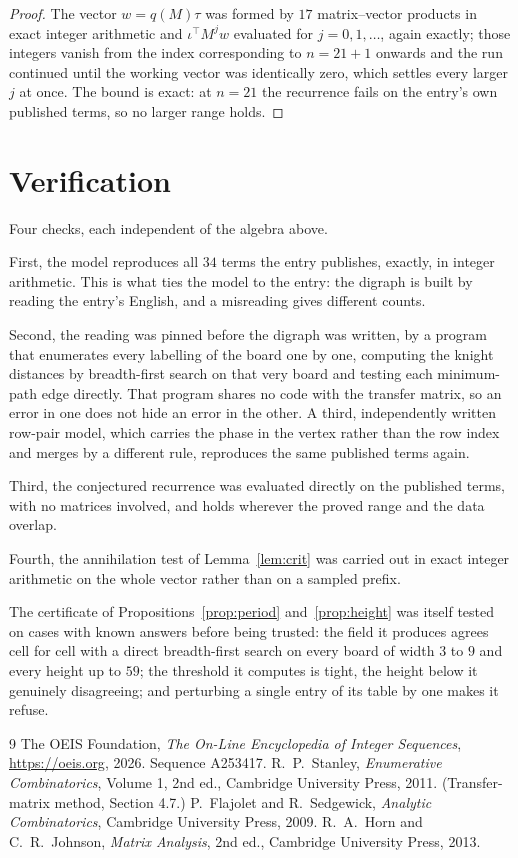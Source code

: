 \documentclass[11pt,a4paper]{article}
\theoremstyle{plain}
\theoremstyle{definition}
\begin{document}
\begin{proof}
The vector $w=q(M)\tau$ was formed by $17$ matrix--vector products in exact integer
arithmetic and $\iota^{\!\top}M^{j}w$ evaluated for $j=0,1,\dots$, again exactly; those
integers vanish from the index corresponding to $n=21+1$ onwards and the run continued
until the working vector was identically zero, which settles every larger $j$ at once. The bound is exact: at $n=21$ the recurrence fails on the entry's own published terms, so no larger range holds.
\end{proof}

\section{Verification}

Four checks, each independent of the algebra above.

First, the model reproduces all $34$ terms the entry publishes, exactly, in integer
arithmetic. This is what ties the model to the entry: the digraph is built by reading the
entry's English, and a misreading gives different counts.

Second, the reading was pinned before the digraph was written, by a program that enumerates
every labelling of the board one by one, computing the knight distances by breadth-first
search on that very board and testing each minimum-path edge directly. That program shares no
code with the transfer matrix, so an error in one does not hide an error in the other. A
third, independently written row-pair model, which carries the phase in the vertex rather than
the row index and merges by a different rule, reproduces the same published terms again.

Third, the conjectured recurrence was evaluated directly on the published terms, with no
matrices involved, and holds wherever the proved range and the data overlap.

Fourth, the annihilation test of Lemma~\ref{lem:crit} was carried out in exact integer
arithmetic on the whole vector rather than on a sampled prefix.

The certificate of Propositions~\ref{prop:period} and~\ref{prop:height} was itself tested
on cases with known answers before being trusted: the field it produces agrees cell for cell
with a direct breadth-first search on every board of width $3$ to $9$ and every height up to
$59$; the threshold it computes is tight, the height below it genuinely disagreeing; and
perturbing a single entry of its table by one makes it refuse.

\begin{thebibliography}{9}
 The OEIS Foundation, \emph{The On-Line Encyclopedia of Integer
Sequences}, \url{https://oeis.org}, 2026. Sequence A253417.
 R.~P.~Stanley, \emph{Enumerative Combinatorics}, Volume 1, 2nd ed.,
Cambridge University Press, 2011. (Transfer-matrix method, Section 4.7.)
 P.~Flajolet and R.~Sedgewick, \emph{Analytic Combinatorics}, Cambridge
University Press, 2009.
 R.~A.~Horn and C.~R.~Johnson, \emph{Matrix Analysis}, 2nd ed., Cambridge
University Press, 2013.
\end{thebibliography}
\end{document}
